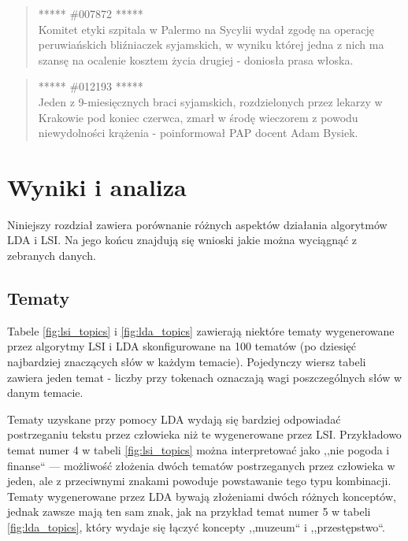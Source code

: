 \documentclass[11pt,a4paper]{article}
\begin{document}
\begin{quote} ***** \#007872 *****\\ Komitet etyki szpitala w Palermo na Sycylii
wydał zgodę na operację peruwiańskich bliźniaczek syjamskich, w wyniku której
jedna z nich ma szansę na ocalenie kosztem życia drugiej - doniosła prasa
włoska.  \end{quote}

\begin{quote} ***** \#012193 *****\\ Jeden z 9-miesięcznych braci syjamskich,
rozdzielonych przez lekarzy w Krakowie pod koniec czerwca, zmarł w środę
wieczorem z powodu niewydolności krążenia - poinformował PAP docent Adam
Bysiek.  \end{quote}

\section{Wyniki i analiza}

Niniejszy rozdział zawiera porównanie różnych aspektów działania algorytmów LDA
i LSI. Na jego końcu znajdują się wnioski jakie można wyciągnąć z zebranych
danych.

\subsection{Tematy}

Tabele \ref{fig:lsi_topics} i \ref{fig:lda_topics} zawierają niektóre tematy
wygenerowane przez algorytmy LSI i LDA skonfigurowane na 100 tematów (po
dziesięć najbardziej znaczących słów w każdym temacie). Pojedynczy wiersz
tabeli zawiera jeden temat - liczby przy tokenach oznaczają wagi poszczególnych
słów w danym temacie.

Tematy uzyskane przy pomocy LDA wydają się bardziej odpowiadać postrzeganiu
tekstu przez człowieka niż te wygenerowane przez LSI.  Przykładowo temat numer 4 w tabeli
\ref{fig:lsi_topics} można interpretować jako ,,nie pogoda i finanse`` ---
możliwość złożenia dwóch tematów postrzeganych przez człowieka w jeden, ale z
przeciwnymi znakami powoduje powstawanie tego typu kombinacji. Tematy wygenerowane
przez LDA bywają złożeniami dwóch różnych konceptów, jednak zawsze mają ten sam znak,
jak na przykład temat numer 5 w tabeli \ref{fig:lda_topics}, który wydaje się łączyć
koncepty ,,muzeum`` i ,,przestępstwo``.
\end{document}
